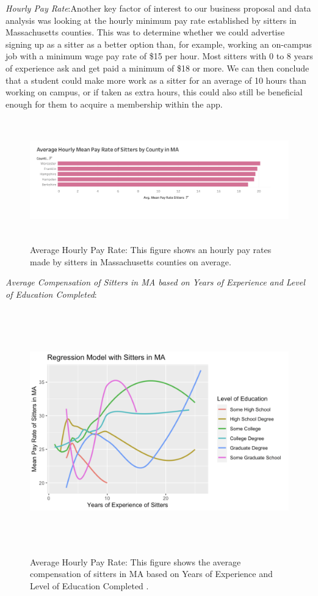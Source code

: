 \documentclass[12pt]{article}
\begin{document}
\newpage

\emph{Hourly Pay Rate}:Another key factor of interest to our business
proposal and data analysis was looking at the hourly minimum pay rate
established by sitters in Massachusetts counties. This was to determine
whether we could advertise signing up as a sitter as a better option
than, for example, working an on-campus job with a minimum wage pay rate
of \$15 per hour. Most sitters with 0 to 8 years of experience ask and
get paid a minimum of \$18 or more. We can then conclude that a student
could make more work as a sitter for an average of 10 hours than working
on campus, or if taken as extra hours, this could also still be
beneficial enough for them to acquire a membership within the app.

\begin{figure}
\centering
\includegraphics[width=6.25in,height=2.08333in]{IMAGES/meanpay.png}
\caption{Average Hourly Pay Rate: This figure shows an hourly pay rates
made by sitters in Massachusetts counties on average.}
\end{figure}

\newpage

\emph{Average Compensation of Sitters in MA based on Years of Experience
and Level of Education Completed}:

\begin{figure}
\centering
\includegraphics[width=6.25in,height=4.16667in]{IMAGES/regressionmodel.png}
\caption{Average Hourly Pay Rate: This figure shows the average
compensation of sitters in MA based on Years of Experience and Level of
Education Completed .}
\end{figure}
\end{document}
